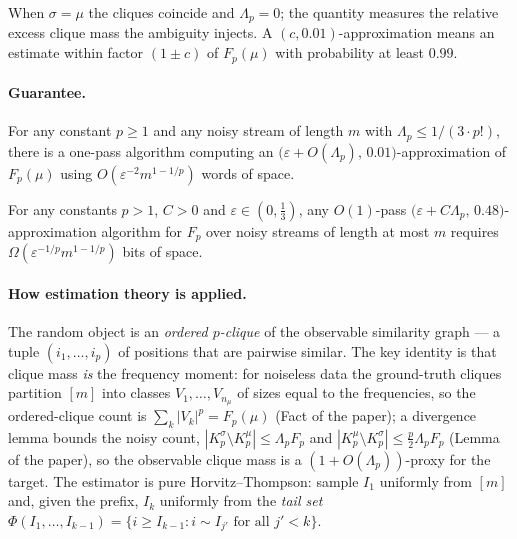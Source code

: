 When $\sigma = \mu$ the cliques coincide and $\Lambda_p = 0$; the quantity measures the
relative excess clique mass the ambiguity injects. A $(c, 0.01)$-approximation means an
estimate within factor $(1\pm c)$ of $F_p(\mu)$ with probability at least $0.99$.

\paragraph{Guarantee.}

\begin{theorem}
\label{thm:est-fp-upper}
For any constant $p \ge 1$ and any noisy stream of length $m$ with
$\Lambda_p \le 1/(3\cdot p!)$, there is a one-pass algorithm computing an
$\bigl(\varepsilon + O(\Lambda_p),\, 0.01\bigr)$-approximation of $F_p(\mu)$ using
$O(\varepsilon^{-2} m^{1-1/p})$ words of space. \eop
\end{theorem}

\begin{theorem}\label{thm:est-fp-lower}
For any constants $p > 1$, $C > 0$ and $\varepsilon \in (0,\tfrac13)$, any $O(1)$-pass
$\bigl(\varepsilon + C\Lambda_p,\, 0.48\bigr)$-approximation algorithm for $F_p$ over noisy
streams of length at most $m$ requires $\Omega(\varepsilon^{-1/p} m^{1-1/p})$ bits of space.
\eop
\end{theorem}

\paragraph{How estimation theory is applied.}
The random object is an \emph{ordered $p$-clique} of the observable similarity graph --- a tuple
$(i_1,\dots,i_p)$ of positions that are pairwise similar. The key identity is that clique mass
\emph{is} the frequency moment: for noiseless data the ground-truth cliques partition $[m]$ into
classes $V_1,\dots,V_{n_\mu}$ of sizes equal to the frequencies, so the ordered-clique count is
$\sum_k |V_k|^p = F_p(\mu)$ (Fact of the paper); a divergence lemma bounds the noisy count,
$|K_p^\sigma \setminus K_p^\mu| \le \Lambda_p F_p$ and $|K_p^\mu \setminus K_p^\sigma| \le
\tfrac{p}{2}\Lambda_p F_p$ (Lemma of the paper), so the observable clique mass is a
$(1 + O(\Lambda_p))$-proxy for the target. The estimator is pure Horvitz--Thompson: sample
$I_1$ uniformly from $[m]$ and, given the prefix, $I_k$ uniformly from the \emph{tail set}
$\Phi(I_1,\dots,I_{k-1}) = \{i \ge I_{k-1} : i \sim I_{j'} \text{ for all } j' < k\}$.

